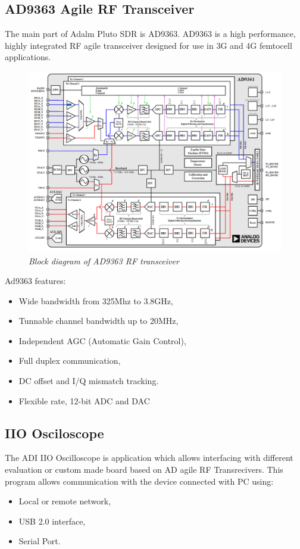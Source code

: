 \documentclass[en,printmode]{mgr}
\begin{document}
		\subsection*{AD9363 Agile RF Transceiver}
			The main part of Adalm Pluto SDR is AD9363.  AD9363 is a high performance, highly
			integrated RF agile transceiver designed for use in 3G and 4G femtocell applications.
			
			\begin{figure}[!htb]
    			\centering
   				\includegraphics[width=\textwidth]{images/ad9361_sch.png}
   		 		\caption{\textit{Block diagram of AD9363 RF transceiver}}
			\end{figure}
			
			Ad9363 features:
			\begin{itemize}
				\item Wide bandwidth from 325Mhz to 3.8GHz,
				\item Tunnable channel bandwidth up to 20MHz,
				\item Independent AGC (Automatic Gain Control),
				\item Full duplex communication,
				\item DC offset and I/Q mismatch tracking.
				\item Flexible rate, 12-bit ADC and DAC
			\end{itemize}
		\subsection{IIO Osciloscope}
			The ADI IIO Oscilloscope is application which allows interfacing with different
			evaluation or custom made board based on AD agile RF Transrecivers. This program allows
			communication with the device connected with PC
			using:
			\begin{itemize}
				\item Local or remote network,
				\item USB 2.0 interface,
				\item Serial Port.
			\end{itemize}			 
			
\end{document}
